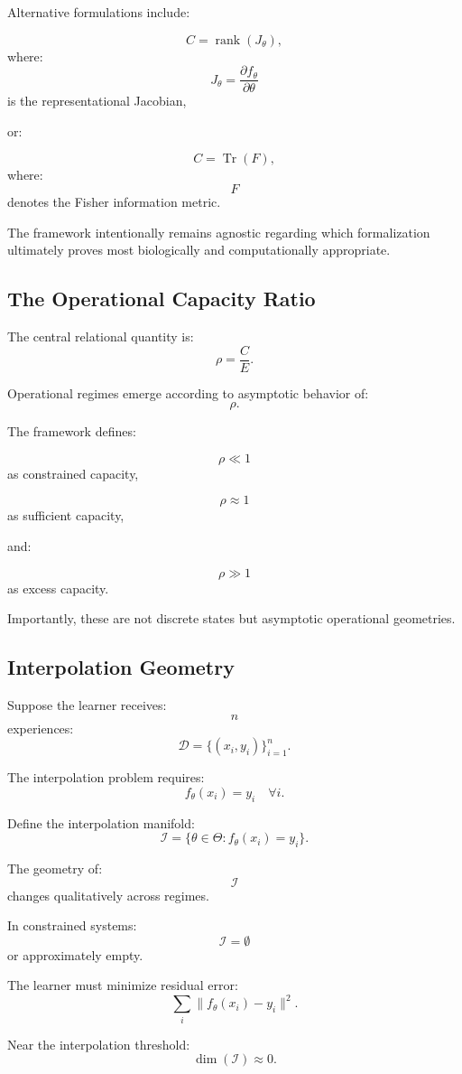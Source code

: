 \documentclass[12pt,a4paper]{article}
\begin{document}
Alternative formulations include:

\[
C
=
\operatorname{rank}(J_\theta),
\]
where:
\[
J_\theta
=
\frac{\partial f_\theta}{\partial \theta}
\]
is the representational Jacobian,

or:

\[
C
=
\operatorname{Tr}(F),
\]
where:
\[
F
\]
denotes the Fisher information metric.

The framework intentionally remains agnostic regarding which formalization ultimately proves most biologically and computationally appropriate.

\subsection{The Operational Capacity Ratio}

The central relational quantity is:
\[
\rho
=
\frac{C}{E}.
\]

Operational regimes emerge according to asymptotic behavior of:
\[
\rho.
\]

The framework defines:

\[
\rho \ll 1
\]
as constrained capacity,

\[
\rho \approx 1
\]
as sufficient capacity,

and:

\[
\rho \gg 1
\]
as excess capacity.

Importantly, these are not discrete states but asymptotic operational geometries.

\subsection{Interpolation Geometry}

Suppose the learner receives:
\[
n
\]
experiences:
\[
\mathcal{D}
=
\{
(x_i,y_i)
\}_{i=1}^n.
\]

The interpolation problem requires:
\[
f_\theta(x_i)
=
y_i
\quad
\forall i.
\]

Define the interpolation manifold:
\[
\mathcal{I}
=
\{
\theta \in \Theta
:
f_\theta(x_i)=y_i
\}.
\]

The geometry of:
\[
\mathcal{I}
\]
changes qualitatively across regimes.

In constrained systems:
\[
\mathcal{I}
=
\emptyset
\]
or approximately empty.

The learner must minimize residual error:
\[
\sum_i
\|f_\theta(x_i)-y_i\|^2.
\]

Near the interpolation threshold:
\[
\dim(\mathcal{I})
\approx
0.
\]
\end{document}
